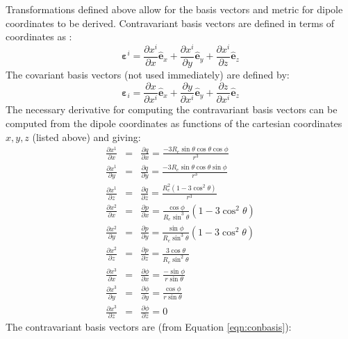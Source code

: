 \documentclass[11pt,letterpaper]{article}
\begin{document}
Transformations defined above allow for the basis vectors and metric for dipole coordinates to be derived.  Contravariant basis vectors are defined in terms of coordinates as \citep[][ Chapter 4]{Arfken7th}:
\begin{equation}
\boldsymbol{\varepsilon}^i = \frac{\partial x^i}{\partial x} \hat{\mathbf{e}}_x + \frac{\partial x^i}{\partial y} \hat{\mathbf{e}}_y + \frac{\partial x^i}{\partial z} \hat{\mathbf{e}}_z \label{eqn:conbasis}
\end{equation}
The covariant basis vectors (not used immediately) are defined by:
\begin{equation}
\boldsymbol{\varepsilon}_i = \frac{\partial x}{\partial x^i} \hat{\mathbf{e}}_x + \frac{\partial y}{\partial x^i} \hat{\mathbf{e}}_y + \frac{\partial z}{\partial x^i} \hat{\mathbf{e}}_z \label{eqn:covbasis}
\end{equation}
The necessary derivative for computing the contravariant basis vectors can be computed from the dipole coordinates as functions of the cartesian coordinates $x,y,z$ (listed above) and giving:  
\begin{eqnarray}
\frac{\partial x^1}{\partial x} &=& \frac{\partial q}{\partial x} = \frac{-3 R_e \sin \theta \cos \theta \cos \phi}{r^3} \\
\frac{\partial x^1}{\partial y} &=& \frac{\partial q}{\partial y} = \frac{-3 R_e \sin \theta \cos \theta \sin \phi}{r^3} \\
\frac{\partial x^1}{\partial z} &=& \frac{\partial q}{\partial z} = \frac{R_e^2 \left( 1 - 3 \cos^2 \theta \right)}{r^3} \\
\frac{\partial x^2}{\partial x} &=& \frac{\partial p}{\partial x} = \frac{\cos \phi}{ R_e \sin^3 \theta} \left( 1 - 3 \cos^2 \theta \right) \\
\frac{\partial x^2}{\partial y} &=& \frac{\partial p}{\partial y} = \frac{\sin \phi}{ R_e \sin^3 \theta} \left( 1 - 3 \cos^2 \theta \right) \\
\frac{\partial x^2}{\partial z} &=& \frac{\partial p}{\partial z} = \frac{3 \cos \theta}{R_e \sin^2 \theta}\\
\frac{\partial x^3}{\partial x} &=& \frac{\partial \phi}{\partial x} = \frac{- \sin \phi}{r \sin \theta} \\
\frac{\partial x^3}{\partial y} &=& \frac{\partial \phi}{\partial y} = \frac{\cos \phi}{r \sin \theta} \\
\frac{\partial x^3}{\partial z} &=& \frac{\partial \phi}{\partial z} = 0
\end{eqnarray}
The contravariant basis vectors are (from Equation \ref{eqn:conbasis}):
\end{document}
